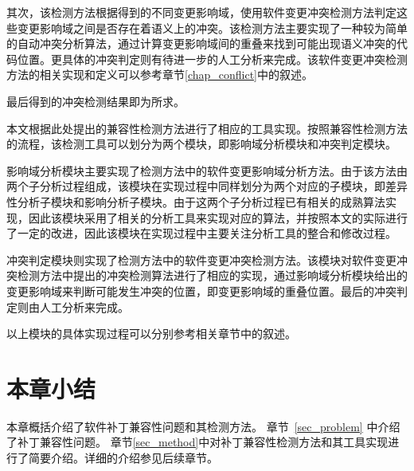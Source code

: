 其次，该检测方法根据得到的不同变更影响域，使用软件变更冲突检测方法判定这些变更影响域之间是否存在着语义上的冲突。该检测方法主要实现了一种较为简单的自动冲突分析算法，通过计算变更影响域间的重叠来找到可能出现语义冲突的代码位置。更具体的冲突判定则有待进一步的人工分析来完成。该软件变更冲突检测方法的相关实现和定义可以参考章节\ref {chap_conflict}中的叙述。

最后得到的冲突检测结果即为所求。

本文根据此处提出的兼容性检测方法进行了相应的工具实现。按照兼容性检测方法的流程，该检测工具可以划分为两个模块，即影响域分析模块和冲突判定模块。

影响域分析模块主要实现了检测方法中的软件变更影响域分析方法。由于该方法由两个子分析过程组成，该模块在实现过程中同样划分为两个对应的子模块，即差异性分析子模块和影响分析子模块。由于这两个子分析过程已有相关的成熟算法实现，因此该模块采用了相关的分析工具来实现对应的算法，并按照本文的实际进行了一定的改进，因此该模块在实现过程中主要关注分析工具的整合和修改过程。

冲突判定模块则实现了检测方法中的软件变更冲突检测方法。该模块对软件变更冲突检测方法中提出的冲突检测算法进行了相应的实现，通过影响域分析模块给出的变更影响域来判断可能发生冲突的位置，即变更影响域的重叠位置。最后的冲突判定则由人工分析来完成。


以上模块的具体实现过程可以分别参考相关章节中的叙述。

\section{本章小结}
本章概括介绍了软件补丁兼容性问题和其检测方法。
章节~\ref{sec_problem} 中介绍了补丁兼容性问题。
章节\ref {sec_method}中对补丁兼容性检测方法和其工具实现进行了简要介绍。详细的介绍参见后续章节。


